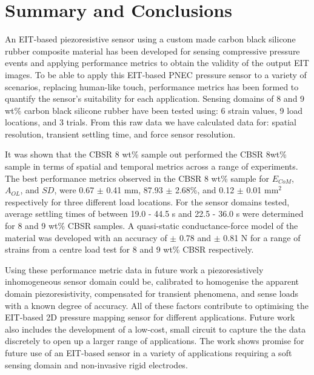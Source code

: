 \section{Summary and Conclusions}\label{sec:Summary and Conclusions}


An EIT-based piezoresistive sensor using a custom made carbon black silicone rubber composite material has been developed for sensing compressive pressure events and applying performance metrics to obtain the validity of the output EIT images. To be able to apply this EIT-based PNEC pressure sensor to a variety of scenarios, replacing human-like touch, performance metrics has been formed to quantify the sensor's suitability for each application. Sensing domains of 8 and 9 wt\% carbon black silicone rubber have been tested using: 6 strain values, 9 load locations, and 3 trials. From this raw data we have calculated data for: spatial resolution, transient settling time, and force sensor resolution. 

It was shown that the CBSR 8 wt\% sample out performed the CBSR 8wt\% sample in terms of spatial and temporal metrics across a range of experiments. The best performance metrics observed in the CBSR 8 wt\% sample for $E_{CoM}$, $A_{OL}$, and $S\!D$, were 0.67 $\pm$ 0.41 mm, 87.93 $\pm$ 2.68\%, and 0.12 $\pm$ 0.01 mm$^2$ respectively for three different load locations. For the sensor domains tested, average settling times of between 19.0 - 44.5 s and 22.5 - 36.0 s were determined for 8 and 9 wt\% CBSR samples. A quasi-static conductance-force model of the material was developed with an accuracy of  $\pm$ 0.78 and  $\pm$ 0.81 N for a range of strains from a centre load test for 8 and 9 wt\% CBSR respectively.

Using these performance metric data in future work a piezoresistively inhomogeneous sensor domain could be, calibrated to homogenise the apparent domain piezoresistivity, compensated for transient phenomena, and sense loads with a known degree of accuracy. All of these factors contribute to optimising the EIT-based 2D pressure mapping sensor for different applications. Future work also includes the development of a low-cost, small circuit to capture the the data discretely to open up a larger range of applications. The work shows promise for future use of an EIT-based sensor in a variety of applications requiring a soft sensing domain and non-invasive rigid electrodes. 
